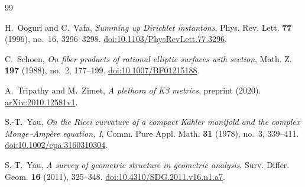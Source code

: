 \documentclass[11pt,a4paper,twoside]{article}
\numberwithin{equation}{section}
\theoremstyle{definition}
\theoremstyle{remark}
\begin{document}
\begin{thebibliography}{99}

H.~Ooguri and C.~Vafa,
\emph{Summing up Dirichlet instantons},
Phys. Rev. Lett. \textbf{77} (1996), no.~16, 3296--3298.
\href{https://doi.org/10.1103/PhysRevLett.77.3296}{doi:10.1103/PhysRevLett.77.3296}.


C.~Schoen,
\emph{On fiber products of rational elliptic surfaces with section},
Math. Z. \textbf{197} (1988), no.~2, 177--199.
\href{https://doi.org/10.1007/BF01215188}{doi:10.1007/BF01215188}.


A.~Tripathy and M.~Zimet,
\emph{A plethora of K3 metrics}, preprint (2020).\newline
\href{https://arxiv.org/abs/2010.12581v1}{arXiv:2010.12581v1}.


S.-T.~Yau,
\emph{On the Ricci curvature of a compact K\"ahler manifold and the
complex Monge--Amp\`ere equation, I},
Comm. Pure Appl. Math. \textbf{31} (1978), no.~3, 339--411.
\href{https://doi.org/10.1002/cpa.3160310304}{doi:10.1002/cpa.3160310304}.

S.-T.~Yau,
\emph{A survey of geometric structure in geometric analysis},
Surv. Differ. Geom. \textbf{16} (2011), 325--348.
\href{https://doi.org/10.4310/SDG.2011.v16.n1.a7}{doi:10.4310/SDG.2011.v16.n1.a7}.
\end{thebibliography}
\end{document}
